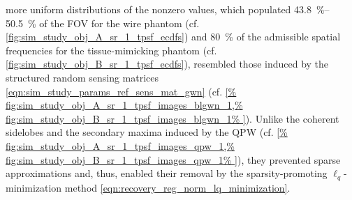 more uniform distributions of
the nonzero values, which populated
\SIrange{43.8}{50.5}{\percent} of
the \ac{FOV} for
the wire phantom
(cf. \cref{fig:sim_study_obj_A_sr_1_tpsf_ecdfs}) and
\SI{80}{\percent} of
the admissible spatial frequencies for
the tissue-mimicking phantom
(cf. \cref{fig:sim_study_obj_B_sr_1_tpsf_ecdfs}), resembled
those induced by
the structured random sensing matrices
\eqref{eqn:sim_study_params_ref_sens_mat_gwn}
(cf. \cref{%
  fig:sim_study_obj_A_sr_1_tpsf_images_blgwn_1,%
  fig:sim_study_obj_B_sr_1_tpsf_images_blgwn_1%
}).
Unlike
the coherent sidelobes and
the secondary maxima induced by
the \ac{QPW}
(cf. \cref{%
  fig:sim_study_obj_A_sr_1_tpsf_images_qpw_1,%
  fig:sim_study_obj_B_sr_1_tpsf_images_qpw_1%
}), they prevented
sparse approximations and, thus, enabled
their removal by
the sparsity-promoting $\ell_{q}$-minimization method
\eqref{eqn:recovery_reg_norm_lq_minimization}.
